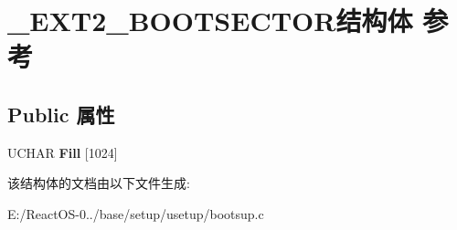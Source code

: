 \hypertarget{struct___e_x_t2___b_o_o_t_s_e_c_t_o_r}{}\section{\+\_\+\+E\+X\+T2\+\_\+\+B\+O\+O\+T\+S\+E\+C\+T\+O\+R结构体 参考}
\label{struct___e_x_t2___b_o_o_t_s_e_c_t_o_r}
\subsection*{Public 属性}
\begin{DoxyCompactItemize}
\item 
\mbox{\label{struct___e_x_t2___b_o_o_t_s_e_c_t_o_r_afe134b6e2a97a6f1ae0192071cb5dfe9}} 
U\+C\+H\+AR {\bfseries Fill} \mbox{[}1024\mbox{]}
\end{DoxyCompactItemize}


该结构体的文档由以下文件生成\+:\begin{DoxyCompactItemize}
\item 
E\+:/\+React\+O\+S-\/0../base/setup/usetup/bootsup.\+c\end{DoxyCompactItemize}
